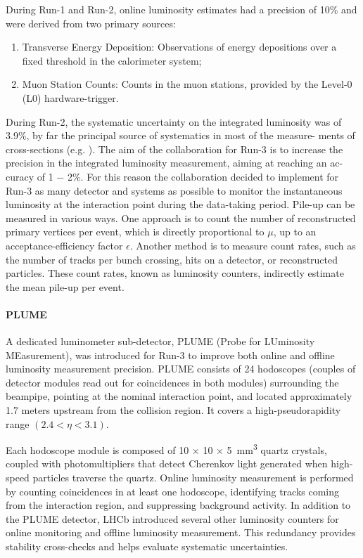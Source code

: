 During Run-1 and Run-2, online luminosity estimates had a precision of 10\% and were derived from two primary sources: 
\begin{enumerate}
    \item Transverse Energy Deposition: Observations of energy depositions over a fixed threshold in the calorimeter system;
    \item Muon Station Counts: Counts in the muon stations, provided by the Level-0 (L0) hardware-trigger.
\end{enumerate}
During Run-2, the systematic uncertainty on the integrated luminosity was of 3.9\%, by far the principal source of systematics in most of the measure- ments of cross-sections (e.g. \cite{j-psi}). The aim of the collaboration for Run-3 is to increase the precision in the integrated luminosity measurement, aiming at reaching an ac- curacy of 1 − 2\%\cite{Aaij:1951625}. For this reason the collaboration decided to implement for Run-3 as many detector and systems as possible to monitor the instantaneous luminosity at the interaction point during the data-taking period.
Pile-up can be measured in various ways. One approach is to count the number of reconstructed primary vertices per event, which is directly proportional to $\mu$, up to an acceptance-efficiency factor $\epsilon$. Another method is to measure count rates, such as the number of tracks per bunch crossing, hits on a detector, or reconstructed particles. These count rates, known as luminosity counters, indirectly estimate the mean pile-up per event.

\paragraph{PLUME}
A dedicated luminometer sub-detector, PLUME (Probe for LUminosity MEasurement), was introduced for Run-3 to improve both online and offline luminosity measurement precision. PLUME consists of 24 hodoscopes (couples of detector modules read out for coincidences in both modules) surrounding the beampipe, pointing at the nominal interaction point, and located approximately 1.7 meters upstream from the collision region. It covers a high-pseudorapidity range $(2.4 < \eta < 3.1)$.

Each hodoscope module is composed of 10 × 10 × \SI{5}{\milli\meter\tothe{3}} quartz crystals, coupled with photomultipliers that detect Cherenkov light generated when high-speed particles traverse the quartz. Online luminosity measurement is performed by counting coincidences in at least one hodoscope, identifying tracks coming from the interaction region, and suppressing background activity.
In addition to the PLUME detector, LHCb introduced several other luminosity counters for online monitoring and offline luminosity measurement. This redundancy provides stability cross-checks and helps evaluate systematic uncertainties.


